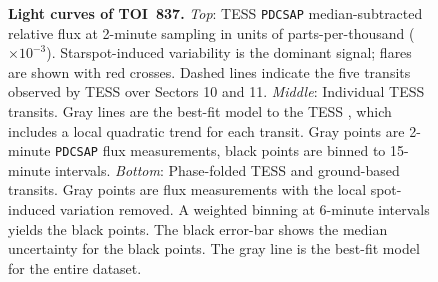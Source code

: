 \documentclass[12pt,twocolumn,tighten]{aastex63}
\newcommand{\tn}{TOI~837} %
\begin{document}
\begin{figure}[!t]
	\begin{center}
		\leavevmode
		
		\vspace{-0.5cm}
	\end{center}
	\vspace{-0.6cm}
	\caption{
    {\bf Light curves of \tn.}
    {\it Top}:
    TESS \texttt{PDCSAP} median-subtracted relative flux at 2-minute
    sampling in units of parts-per-thousand ($\times 10^{-3}$).
    Starspot-induced variability is the dominant signal; flares are
    shown with red crosses.  Dashed lines indicate the five transits
    observed by TESS over Sectors 10 and 11.  {\it Middle}: Individual
    TESS transits.  Gray lines are the best-fit model to the TESS
    , which includes
    a local quadratic trend for each transit. Gray points are 2-minute
    \texttt{PDCSAP} flux measurements, black points are binned to
    15-minute intervals.  {\it Bottom}: Phase-folded TESS and
    ground-based transits.  Gray points are flux
    measurements with the local spot-induced variation removed.  A
    weighted binning at 6-minute intervals yields the black points.
    The black error-bar shows the median uncertainty for the black
    points.  The gray line is the best-fit model for the entire
    dataset.
		\label{fig:thephot}
	}
\end{figure}
\end{document}
